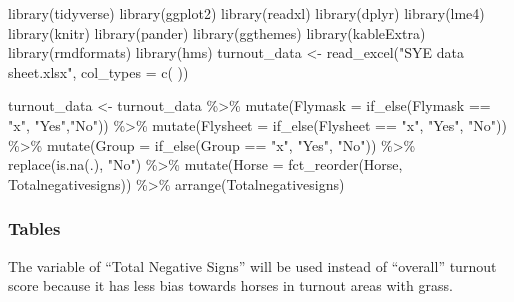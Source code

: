 \documentclass[
]{article}
\newenvironment{Shaded}{\begin{snugshade}}{\end{snugshade}}
\newcommand{\AttributeTok}[1]{\textcolor[rgb]{0.77,0.63,0.00}{#1}}
\newcommand{\FunctionTok}[1]{\textcolor[rgb]{0.00,0.00,0.00}{#1}}
\newcommand{\NormalTok}[1]{#1}
\newcommand{\OtherTok}[1]{\textcolor[rgb]{0.56,0.35,0.01}{#1}}
\newcommand{\SpecialCharTok}[1]{\textcolor[rgb]{0.00,0.00,0.00}{#1}}
\newcommand{\StringTok}[1]{\textcolor[rgb]{0.31,0.60,0.02}{#1}}
\begin{document}
\begin{Shaded}
\begin{Highlighting}[]
\FunctionTok{library}\NormalTok{(tidyverse)}
\FunctionTok{library}\NormalTok{(ggplot2)}
\FunctionTok{library}\NormalTok{(readxl)}
\FunctionTok{library}\NormalTok{(dplyr)}
\FunctionTok{library}\NormalTok{(lme4)}
\FunctionTok{library}\NormalTok{(knitr)}
\FunctionTok{library}\NormalTok{(pander)}
\FunctionTok{library}\NormalTok{(ggthemes)}
\FunctionTok{library}\NormalTok{(kableExtra)}
\FunctionTok{library}\NormalTok{(rmdformats)}
\FunctionTok{library}\NormalTok{(hms)}
\NormalTok{turnout\_data }\OtherTok{\textless{}{-}} \FunctionTok{read\_excel}\NormalTok{(}\StringTok{"SYE data sheet.xlsx"}\NormalTok{,}
 \AttributeTok{col\_types =} \FunctionTok{c}\NormalTok{(}
\NormalTok{ ))}

\NormalTok{turnout\_data }\OtherTok{\textless{}{-}}\NormalTok{ turnout\_data }\SpecialCharTok{\%\textgreater{}\%} \FunctionTok{mutate}\NormalTok{(}\AttributeTok{Flymask =} \FunctionTok{if\_else}\NormalTok{(Flymask }\SpecialCharTok{==} \StringTok{"x"}\NormalTok{, }\StringTok{"Yes"}\NormalTok{,}\StringTok{"No"}\NormalTok{)) }\SpecialCharTok{\%\textgreater{}\%} 
  \FunctionTok{mutate}\NormalTok{(}\AttributeTok{Flysheet =} \FunctionTok{if\_else}\NormalTok{(Flysheet }\SpecialCharTok{==} \StringTok{"x"}\NormalTok{, }\StringTok{"Yes"}\NormalTok{, }\StringTok{"No"}\NormalTok{)) }\SpecialCharTok{\%\textgreater{}\%}
  \FunctionTok{mutate}\NormalTok{(}\AttributeTok{Group =} \FunctionTok{if\_else}\NormalTok{(Group }\SpecialCharTok{==} \StringTok{"x"}\NormalTok{, }\StringTok{"Yes"}\NormalTok{, }\StringTok{"No"}\NormalTok{)) }\SpecialCharTok{\%\textgreater{}\%}
  \FunctionTok{replace}\NormalTok{(}\FunctionTok{is.na}\NormalTok{(.), }\StringTok{"No"}\NormalTok{) }\SpecialCharTok{\%\textgreater{}\%}  
  \FunctionTok{mutate}\NormalTok{(}\AttributeTok{Horse =} \FunctionTok{fct\_reorder}\NormalTok{(Horse, Totalnegativesigns)) }\SpecialCharTok{\%\textgreater{}\%}
 \FunctionTok{arrange}\NormalTok{(Totalnegativesigns) }
\end{Highlighting}
\end{Shaded}

\hypertarget{tables}{%
\subsubsection{Tables}\label{tables}}

The variable of ``Total Negative Signs'' will be used instead of
``overall'' turnout score because it has less bias towards horses in
turnout areas with grass.
\end{document}
